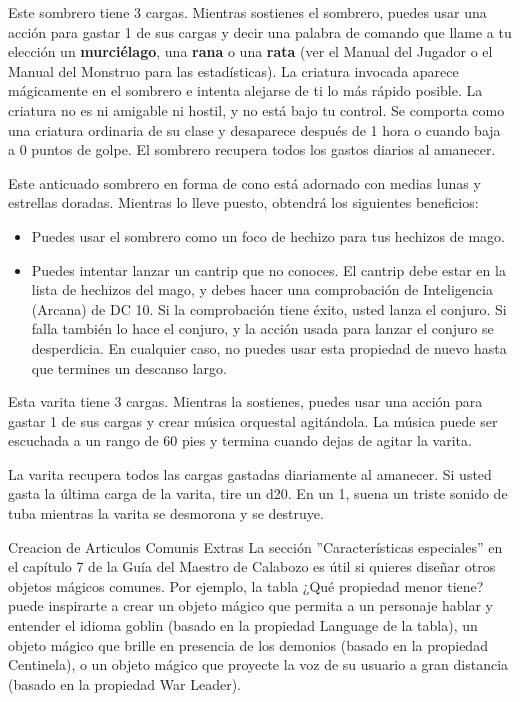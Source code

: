 \documentclass[a4paper,twocolumn,openany,10pt]{dndbook}
\begin{document}
Este sombrero tiene 3 cargas. Mientras sostienes el sombrero, puedes usar una acción para gastar 1 de sus cargas y decir una
palabra de comando que llame a tu elección un \textbf{murciélago}, una \textbf{rana} o una \textbf{rata} (ver el Manual del
Jugador o el Manual del Monstruo para las estadísticas). La criatura invocada aparece mágicamente en el sombrero e intenta
alejarse de ti lo más rápido posible. La criatura no es ni amigable ni hostil, y no está bajo tu control. Se comporta como una
criatura ordinaria de su clase y desaparece después de 1 hora o cuando baja a 0 puntos de golpe. El sombrero recupera todos los
gastos diarios al amanecer. 

Este anticuado sombrero en forma de cono está adornado con medias lunas y estrellas doradas. Mientras lo lleve puesto, obtendrá
los siguientes beneficios:
\begin{itemize}
	\item Puedes usar el sombrero como un foco de hechizo para tus hechizos de mago.
	
	\item Puedes intentar lanzar un cantrip que no conoces. El cantrip debe estar en la lista de hechizos del mago, y debes
	hacer una comprobación de Inteligencia (Arcana) de DC 10. Si la comprobación tiene éxito, usted lanza el conjuro. Si falla
	también lo hace el conjuro, y la acción usada para lanzar el conjuro se desperdicia. En cualquier caso, no puedes usar esta
	propiedad de nuevo hasta que termines un descanso largo.
\end{itemize}

Esta varita tiene 3 cargas. Mientras la sostienes, puedes usar una acción para gastar 1 de sus cargas y crear música orquestal
agitándola. La música puede ser escuchada a un rango de 60 pies y termina cuando dejas de agitar la varita.

La varita recupera todos las cargas gastadas diariamente al amanecer. Si usted gasta la última carga de la varita, tire un d20.
En un 1, suena un triste sonido de tuba mientras la varita se desmorona y se destruye.

\begin{paperbox}[float=!b]{Creacion de Articulos Comunis Extras}
	La sección ''Características especiales'' en el capítulo 7 de la Guía del Maestro de Calabozo es útil si quieres diseñar otros
	objetos mágicos comunes. Por ejemplo, la tabla ¿Qué propiedad menor tiene? puede inspirarte a crear un objeto mágico que
	permita a un personaje hablar y entender el idioma goblin (basado en la propiedad Language de la tabla), un objeto mágico
	que brille en presencia de los demonios (basado en la propiedad Centinela), o un objeto mágico que proyecte la voz de su
	usuario a gran distancia (basado en la propiedad War Leader).  
\end{paperbox}	
\end{document}
